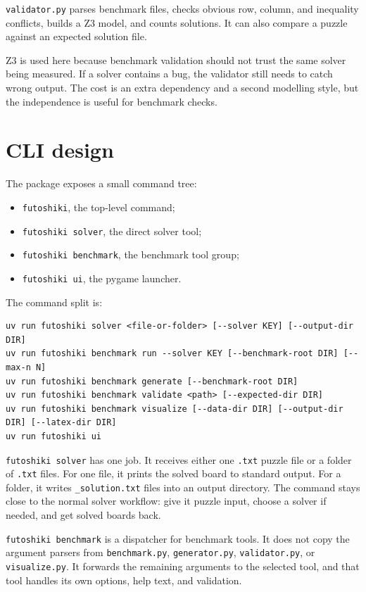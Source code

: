 \documentclass[11pt]{article}
\begin{document}
\texttt{validator.py} parses benchmark files, checks obvious row, column, and
inequality conflicts, builds a Z3 model, and counts solutions. It can also
compare a puzzle against an expected solution file.

Z3 is used here because benchmark validation should not trust the same solver
being measured. If a solver contains a bug, the validator still needs to catch
wrong output. The cost is an extra dependency and a second modelling style, but
the independence is useful for benchmark checks.

\section{CLI design}

The package exposes a small command tree:

\begin{itemize}
  \item \texttt{futoshiki}, the top-level command;
  \item \texttt{futoshiki solver}, the direct solver tool;
  \item \texttt{futoshiki benchmark}, the benchmark tool group;
  \item \texttt{futoshiki ui}, the pygame launcher.
\end{itemize}

The command split is:

\begin{verbatim}
uv run futoshiki solver <file-or-folder> [--solver KEY] [--output-dir DIR]
uv run futoshiki benchmark run --solver KEY [--benchmark-root DIR] [--max-n N]
uv run futoshiki benchmark generate [--benchmark-root DIR]
uv run futoshiki benchmark validate <path> [--expected-dir DIR]
uv run futoshiki benchmark visualize [--data-dir DIR] [--output-dir DIR] [--latex-dir DIR]
uv run futoshiki ui
\end{verbatim}

\texttt{futoshiki solver} has one job. It receives either one \texttt{.txt}
puzzle file or a folder of \texttt{.txt} files. For one file, it prints the
solved board to standard output. For a folder, it writes
\texttt{\_solution.txt} files into an output directory. The command stays close
to the normal solver workflow: give it puzzle input, choose a solver if needed,
and get solved boards back.

\texttt{futoshiki benchmark} is a dispatcher for benchmark tools. It does not
copy the argument parsers from \texttt{benchmark.py}, \texttt{generator.py},
\texttt{validator.py}, or \texttt{visualize.py}. It forwards the remaining
arguments to the selected tool, and that tool handles its own options, help
text, and validation.
\end{document}
